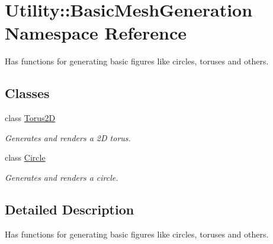 \hypertarget{namespace_utility_1_1_basic_mesh_generation}{\section{Utility\-:\-:Basic\-Mesh\-Generation Namespace Reference}
\label{namespace_utility_1_1_basic_mesh_generation}
}


Has functions for generating basic figures like circles, toruses and others.  


\subsection*{Classes}
\begin{DoxyCompactItemize}
\item 
class \hyperlink{class_utility_1_1_basic_mesh_generation_1_1_torus2_d}{Torus2\-D}
\begin{DoxyCompactList}\small\item\em Generates and renders a 2\-D torus. \end{DoxyCompactList}\item 
class \hyperlink{class_utility_1_1_basic_mesh_generation_1_1_circle}{Circle}
\begin{DoxyCompactList}\small\item\em Generates and renders a circle. \end{DoxyCompactList}\end{DoxyCompactItemize}


\subsection{Detailed Description}
Has functions for generating basic figures like circles, toruses and others. 